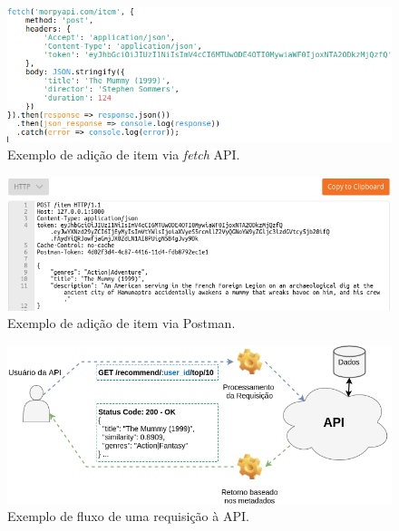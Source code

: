 \documentclass[12pt, openright, oneside, a4paper, brazil]{abntex2}
\begin{document}
\begin{figure}[htp]

	\caption{\label{fetch_api}Exemplo de adição de item via \textit{fetch} API.}

	\begin{center}
		\includegraphics[scale=0.8]{images/fetch_api.png}
	\end{center}

	\hspace{5.5cm}{Fonte: O Autor.}

\end{figure}

\begin{figure}[htp]

	\caption{\label{postman}Exemplo de adição de item via Postman.}

	\begin{center}
		\includegraphics[scale=0.85]{images/postman.png}
	\end{center}

	\hspace{5.5cm}{Fonte: O Autor.}

\end{figure}

\begin{figure}[htp]

	\caption{\label{interconnection}Exemplo de fluxo de uma requisição à API.}

	\begin{center}
		\includegraphics[scale=0.62]{images/interconnection.png}
	\end{center}

	\hspace{5.5cm}{Fonte: O Autor.}

\end{figure}
\end{document}
